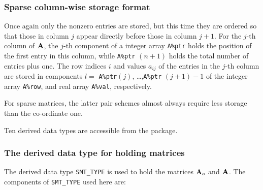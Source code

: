 \documentclass{galahad}
\begin{document}
\subsubsection{Sparse column-wise storage format}\label{columnwise}
Once again only the nonzero entries are stored, but this time
they are ordered so that those in column $j$ appear directly before those
in column $j+1$. For the $j$-th column of ${\mathbf{A}}$, the $j$-th component of a
integer array {\tt A\%ptr} holds the position of the first entry in this column,
while {\tt A\%ptr} $(n+1)$ holds the total number of entries plus one.
The row indices $i$ and values $a_{ij}$ of the entries in the $j$-th column
are stored in components
$l =$ {\tt A\%ptr}$(j)$, \ldots ,{\tt A\%ptr} $(j+1)-1$ of the
integer array {\tt A\%row}, and real array {\tt A\%val}, respectively.

For sparse matrices, the latter pair schemes almost always require less
storage than the co-ordinate one.








\galtypes
Ten derived data types are accessible from the package.


\subsubsection{The derived data type for holding matrices}\label{typesmt}
The derived data type {\tt SMT\_TYPE} is used to hold the matrices ${\mathbf{A}}_o$
and ${\mathbf{A}}$.
The components of {\tt SMT\_TYPE} used here are:
\end{document}
